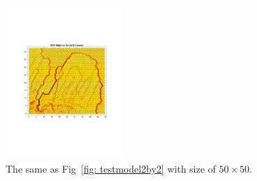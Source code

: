     \begin{figure}
        \centering
        \includegraphics[width=0.4\textwidth]{../images/test_model/50by50_nei3.pdf}
        \caption{The same as Fig~\ref{fig: testmodel2by2} with size of $50\times50$.}
        \label{fig: testmodel3}
    \end{figure}